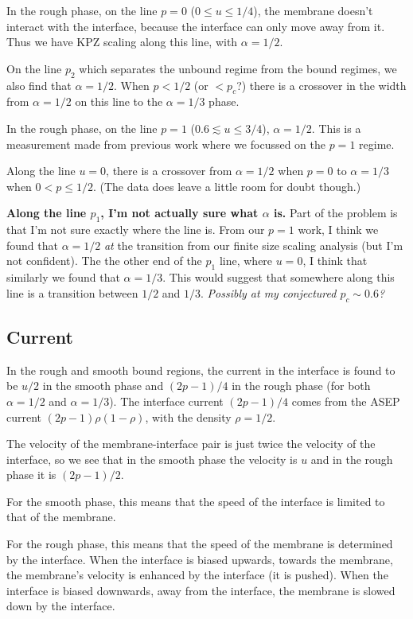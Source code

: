 \documentclass[a4paper,10pt]{article}
\begin{document}
In the rough phase, on the line $p=0$ ($0 \le u \le 1/4$), the membrane doesn't interact with the interface, because the interface can only move away from it. Thus we have KPZ scaling along this line, with $\alpha=1/2$.

On the line $p_2$ which separates the unbound regime from the bound regimes, we also find that $\alpha=1/2$. When $p < 1/2$ (or $<p_c$?) there is a crossover in the width from $\alpha=1/2$ on this line to the $\alpha=1/3$ phase.

In the rough phase, on the line $p=1$ ($0.6 \lesssim u \le 3/4$), $\alpha = 1/2$. This is a measurement made from previous work where we focussed on the $p=1$ regime.

Along the line $u=0$, there is a crossover from $\alpha = 1/2$ when $p=0$ to $\alpha = 1/3$ when $0 < p \le1/2$. (The data does leave a little room for doubt though.)

{\bf Along the line $p_1$, I'm not actually sure what $\alpha$ is.} Part of the problem is that I'm not sure exactly where the line is. From our $p=1$ work, I think we found that $\alpha=1/2$ \emph{at} the transition from our finite size scaling analysis (but I'm not confident). The the other end of the $p_1$ line, where $u=0$, I think that similarly we found that $\alpha = 1/3$. This would suggest that somewhere along this line is a transition between $1/2$ and $1/3$. \emph{Possibly at my conjectured $p_c \sim 0.6$?}

\subsection{Current}

In the rough and smooth bound regions, the current in the interface is found to be $u/2$ in the smooth phase and $(2p-1)/4$ in the rough phase (for both $\alpha = 1/2$ and $\alpha = 1/3$). The interface current $(2p-1)/4$ comes from the ASEP current $(2p-1)\rho(1-\rho)$, with the density $\rho =1/2$.

The velocity of the membrane-interface pair is just twice the velocity of the interface, so we see that in the smooth phase the velocity is $u$ and in the rough phase it is $(2p-1)/2$.

For the smooth phase, this means that the speed of the interface is limited to that of the membrane. 

For the rough phase, this means that the speed of the membrane is determined by the interface. When the interface is biased upwards, towards the membrane, the membrane's velocity is enhanced by the interface (it is pushed). When the interface is biased downwards, away from the interface, the membrane is slowed down by the interface.
\end{document}
